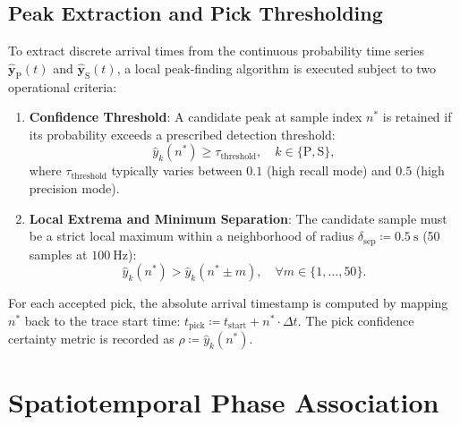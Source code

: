 \subsection{Peak Extraction and Pick Thresholding}
To extract discrete arrival times from the continuous probability
time series $\hat{\mathbf{y}}_{\mathrm{P}}(t)$ and
$\hat{\mathbf{y}}_{\mathrm{S}}(t)$, a
local peak-finding algorithm is executed subject to two operational criteria:
\begin{enumerate}
  \item \textbf{Confidence Threshold}: A candidate peak at sample
    index $n^*$ is retained if its probability exceeds a prescribed
    detection threshold:
    \begin{equation}
      \hat{y}_k(n^*) \ge \tau_{\mathrm{threshold}}, \quad k \in
      \{\mathrm{P}, \mathrm{S}\},
    \end{equation}
    where $\tau_{\mathrm{threshold}}$ typically varies between $\num{0.1}$
    (high recall mode) and $\num{0.5}$ (high precision mode).
  \item \textbf{Local Extrema and Minimum Separation}: The candidate
    sample must be a strict local maximum within a neighborhood of
    radius $\delta_{\mathrm{sep}} \coloneqq \qty{0.5}{\second}$
    (\num{50} samples
    at $\qty{100}{\hertz}$):
    \begin{equation}
      \hat{y}_k(n^*) > \hat{y}_k(n^* \pm m), \quad \forall m \in
      \{1, \dots, \num{50}\}.
    \end{equation}
\end{enumerate}
For each accepted pick, the absolute arrival timestamp is computed
by mapping $n^*$ back to the trace start time: $t_{\mathrm{pick}} \coloneqq
t_{\mathrm{start}} + n^* \cdot \Delta t$. The pick confidence
certainty metric is recorded as $\rho \coloneqq \hat{y}_k(n^*)$.

\section{Spatiotemporal Phase Association}
\label{sec:phase_association}

